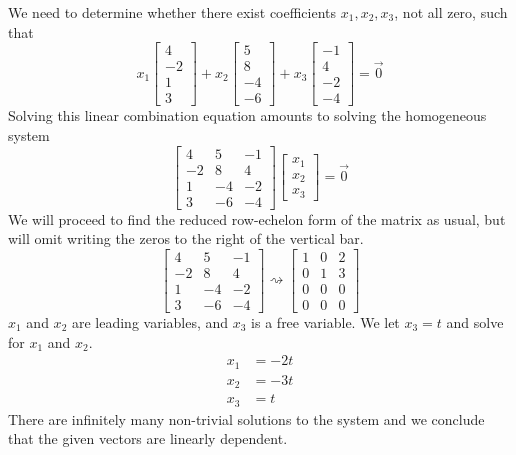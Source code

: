 \documentclass{ximera}
\begin{document}
\begin{example}
\begin{explanation} We need to determine whether there exist coefficients $x_1, x_2, x_3$, not all zero, such that 
$$x_1\begin{bmatrix}4\\-2\\1\\3\end{bmatrix}+ x_2\begin{bmatrix}5\\8\\-4\\-6\end{bmatrix}+ x_3\begin{bmatrix}-1\\4\\-2\\-4\end{bmatrix}=\vec{0}$$
Solving this linear combination equation amounts to solving the homogeneous system
$$\begin{bmatrix}4&5&-1\\-2&8&4\\1&-4&-2\\3&-6&-4\end{bmatrix}\begin{bmatrix}x_1\\x_2\\x_3\end{bmatrix}=\vec{0}$$
We will proceed to find the reduced row-echelon form of the matrix as usual, but will omit writing the zeros to the right of the vertical bar.
$$\begin{bmatrix}4&5&-1\\-2&8&4\\1&-4&-2\\3&-6&-4\end{bmatrix}\rightsquigarrow \begin{bmatrix}1&0&2\\0&1&3\\0&0&0\\0&0&0\end{bmatrix}$$
$x_1$ and $x_2$ are leading variables, and $x_3$ is a free variable.  We let $x_3=t$ and solve for $x_1$ and $x_2$.
\begin{align*}x_1&=-2t\\
x_2&=-3t\\
x_3&=t
\end{align*}
There are infinitely many non-trivial solutions to the system and we conclude that the given vectors are linearly dependent.
\end{explanation}
\end{example}
\end{document}
